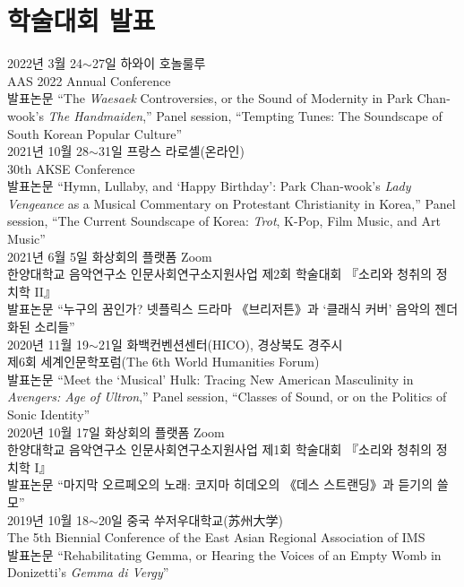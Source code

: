 \documentclass[dvipdfmx,a4paper]{article}
\begin{document}
  \section*{\normalsize 학술대회 발표}
  
  \noindent 2022년 3월 24$\sim$27일 하와이 호놀룰루\\
  AAS 2022 Annual Conference\\
  발표논문 “The \textit{Waesaek} Controversies, or the Sound of Modernity in Park Chan-wook’s \textit{The Handmaiden},” Panel session, “Tempting Tunes: The Soundscape of South Korean Popular Culture”\\
  
  \noindent 2021년 10월 28$\sim$31일 프랑스 라로셸(온라인)\\
  30th AKSE Conference\\
  발표논문 “Hymn, Lullaby, and ‘Happy Birthday’: Park Chan-wook’s \textit{Lady Vengeance} as a Musical Commentary on Protestant Christianity in Korea,” Panel session, “The Current Soundscape of Korea: \textit{Trot}, K-Pop, Film Music, and Art Music”\\
  
  \noindent 2021년 6월 5일 화상회의 플랫폼 Zoom\\
  한양대학교 음악연구소 인문사회연구소지원사업 제2회 학술대회 『소리와 청취의 정치학 II』\\
  발표논문 “누구의 꿈인가? 넷플릭스 드라마 《브리저튼》과 ‘클래식 커버’ 음악의 젠더화된 소리들”\\
  
  \noindent 2020년 11월 19$\sim$21일 화백컨벤션센터(HICO), 경상북도 경주시\\
  제6회 세계인문학포럼(The 6th World Humanities Forum)\\
  발표논문 “Meet the ‘Musical’ Hulk: Tracing New American Masculinity in \textit{Avengers: Age of Ultron},” Panel session, “Classes of Sound, or on the Politics of Sonic Identity”\\
  
  \noindent 2020년 10월 17일 화상회의 플랫폼 Zoom\\
  한양대학교 음악연구소 인문사회연구소지원사업 제1회 학술대회 『소리와 청취의 정치학 I』
\\
  발표논문 “마지막 오르페오의 노래: 코지마 히데오의 《데스 스트랜딩》과 듣기의 쓸모”\\
  
  \noindent 2019년 10월 18$\sim$20일 중국 쑤저우대학교(苏州大学)\\    
  The 5th Biennial Conference of the East Asian Regional Association of IMS\\
  발표논문 “Rehabilitating Gemma, or Hearing the Voices of an Empty Womb in Donizetti’s \textit{Gemma di Vergy}”\\
  
\end{document}
